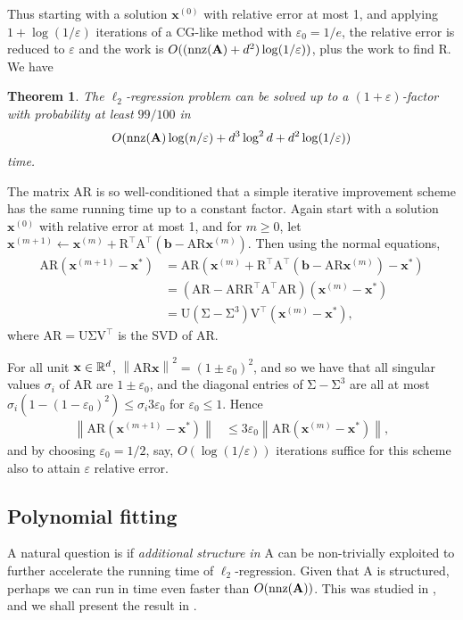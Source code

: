 \documentclass[11pt]{article}
\newcommand{\R}{\ensuremath\mathbb{R}}
\newtheorem{theorem}{Theorem}
\newcommand{\mat}[1]{{\ensuremath{\bm{\mathrm{#1}}}}}
\def\b{{\mathbf b}}
\def\matA{\mat{A}}
\def\matR{\mat{R}}
\def\matU{\mat{U}}
\def\matV{\mat{V}}
\def\nnz{{ \rm nnz }}
\def\x{{\mathbf x}}
\def\b{{\mathbf b}}
\def\norm#1{{\left\|#1\right\|}}
\newcommand{\eps}{\varepsilon}
\begin{document}
Thus starting with a solution $\x^{(0)}$ with 
relative error at most 1, and applying $1+\log(1/\eps)$ iterations
of a CG-like method with $\eps_0 = 1/e$, the relative error is reduced to $\eps$
and the work is $O((\nnz(\matA)+ d^2)\log(1/\eps))$, 
plus the work to find $\matR$. We have

\begin{theorem}\label{thm:it reg}
The $\ell_2$-regression problem can be solved up to a $(1+\eps)$-factor with probability at least 
$99/100$ in
\[
O(\nnz(\matA)\log (n/\eps) + d^3 \log^2 d + d^2\log(1/\eps))
\]
time.
\end{theorem}

The matrix $\matA \matR$ is so well-conditioned that a simple iterative improvement scheme
has the same running time up to a constant factor. Again start with a solution $\x^{(0)}$ with 
relative error at most 1, and for $m\ge 0$,
let $\x^{(m+1)} \gets \x^{(m)} + \matR^\top \matA^\top (\b - \matA \matR \x^{(m)})$.
Then using the normal equations,
\begin{align*}
\matA \matR(\x^{(m+1)} - \x^*)
	  & = \matA \matR(\x^{(m)} + \matR^\top \matA^\top (\b - \matA \matR \x^{(m)}) - \x^*)
	\\ & = (\matA\matR - \matA \matR \matR^\top \matA^\top \matA \matR ) (\x^{(m)} - \x^*)
	\\ & = \matU(\mat\Sigma - \mat\Sigma^3)\matV^\top (\x^{(m)} - \x^*),
\end{align*}
where $\matA \matR= \matU \mat\Sigma \matV^\top$ is the SVD of $\matA \matR$.

For all unit $\x\in\R^d$,
$\norm{\matA \matR \x}^2 = (1\pm \eps_0)^2$, and so
we have that all singular values $\sigma_i$ of $\matA \matR$ are $1\pm\eps_0$,
and the diagonal entries of $\mat\Sigma - \mat\Sigma^3$
are all at most $\sigma_i(1- (1 - \varepsilon_0)^2) \le \sigma_i 3\varepsilon_0$ for 
$\varepsilon_0\le 1$. Hence 
\begin{align*}
\norm{\matA \matR(\x^{(m+1)} - \x^*)}
	 & \le 3\eps_0 \norm{\matA \matR(\x^{(m)} - \x^*)},
\end{align*}
and by choosing $\varepsilon_0= 1/2$, say, $O(\log(1/\eps))$ iterations suffice for this
scheme also to attain $\eps$ relative error.

\subsection{Polynomial fitting}\label{sec:polynomialFit}
A natural question is if {\it additional structure in $\matA$} can be non-trivially exploited
to further accelerate the running time of $\ell_2$-regression. Given that $\matA$ is structured,
perhaps we can run in time even faster than $O(\nnz(\matA))$. This was studied in \cite{asw13,anw14},
and we shall present the result in \cite{asw13}. 
\end{document}
